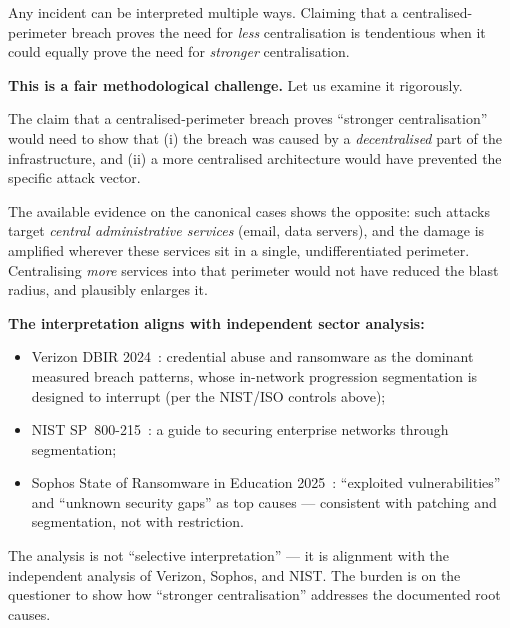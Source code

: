 \bigskip

\begin{questionbox}
Any incident can be interpreted multiple ways. Claiming that a centralised-perimeter breach proves the need for \emph{less} centralisation is tendentious when it could equally prove the need for \emph{stronger} centralisation.
\end{questionbox}

\begin{answerbox}[Answer to Q7.2]
\textbf{This is a fair methodological challenge.} Let us examine it rigorously.

\medskip\noindent The claim that a centralised-perimeter breach proves ``stronger centralisation'' would need to show that (i) the breach was caused by a \emph{decentralised} part of the infrastructure, and (ii) a more centralised architecture would have prevented the specific attack vector.

\medskip\noindent The available evidence on the canonical cases shows the opposite: such attacks target \emph{central administrative services} (email, data servers), and the damage is amplified wherever these services sit in a single, undifferentiated perimeter. Centralising \emph{more} services into that perimeter would not have reduced the blast radius, and plausibly enlarges it.

\medskip\noindent\textbf{The interpretation aligns with independent sector analysis:}
\begin{itemize}[nosep]
    \item Verizon DBIR 2024~\cite{verizon-dbir2024}: credential abuse and ransomware as the dominant measured breach patterns, whose in-network progression segmentation is designed to interrupt (per the NIST/ISO controls above);
    \item NIST SP~800-215~\cite{nist-sp800-215}: a guide to securing enterprise networks through segmentation;
    \item Sophos State of Ransomware in Education 2025~\cite{sophos-ransomware-edu2025}: ``exploited vulnerabilities'' and ``unknown security gaps'' as top causes --- consistent with patching and segmentation, not with restriction.
\end{itemize}

\noindent The analysis is not ``selective interpretation'' --- it is alignment with the independent analysis of Verizon, Sophos, and NIST. The burden is on the questioner to show how ``stronger centralisation'' addresses the documented root causes.
\end{answerbox}

